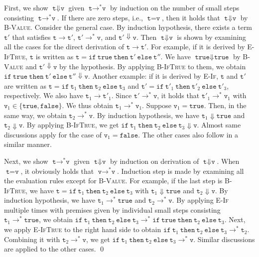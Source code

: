 \documentclass{article}
\newcommand{\code}[1]{\texttt{#1}}
\newcommand{\Bigstep}{\Downarrow}
\newcommand{\False}{\code{false}}
\newcommand{\IfThenElse}[3]{\code{if}~#1~\code{then}~#2~\code{else}~#3}
\newcommand{\Rule}[1]{\textsc{#1}}
\newcommand{\True}{\code{true}}
\begin{document}
First, we show $\code t \Bigstep \code v$ given $\code t \to^* \code v$
  by induction on the number of small steps consisting $\code t \to^* \code v$.
If there are zero steps, i.e., $\code t = \code v$,
  then it holds that $\code t \Bigstep \code v$ by \Rule{B-Value}.
Consider the general case.
By induction hypothesis,
  there exists a term $\code t'$ that satisfies
  $\code t \to \code t'$,
  $\code t' \to^* \code v$,
  and $\code t' \Bigstep \code v$.
Then $\code t \Bigstep \code v$ is shown by examining all the cases for
  the direct derivation of $\code t \to \code t'$.
For example, if it is derived by \Rule{E-IfTrue},
  $\code t$ is written as $\code t = \IfThenElse{\True}{\code t'}{\code t''}$.
We have $\True \Bigstep \True$ by \Rule{B-Value}
  and $\code t' \Bigstep \code v$ by the hypothesis.
By applying \Rule{B-IfTrue} to them,
  we obtain $\IfThenElse{\True}{\code t'}{\code t''} \Bigstep \code v$.
Another example: if it is derived by \Rule{E-If},
  $\code t$ and $\code t'$ are written as
  $\code t = \IfThenElse{\code t_1}{\code t_2}{\code t_3}$ and
  $\code t' = \IfThenElse{\code t'_1}{\code t'_2}{\code t'_3}$, respectively.
We also have $\code t_1 \to \code t'_1$.
Since $\code t' \to^* \code v$,
  it holds that $\code t'_1 \to^* \code v_1$ with $\code v_1 \in \{\True, \False\}$.
We thus obtain $\code t_1 \to^* \code v_1$.
Suppose $\code v_1 = \True$.
Then, in the same way, we obtain $\code t_2 \to^* \code v$.
By induction hypothesis,
  we have $\code t_1 \Bigstep \True$ and $\code t_2 \Bigstep \code v$.
By applying \Rule{B-IfTrue},
  we get $\IfThenElse{\code t_1}{\code t_2}{\code t_3} \Bigstep \code v$.
Almost same discussions apply for the case of $\code v_1 = \False$.
The other cases also follow in a similar manner.

Next, we show $\code t \to^* \code v$ given $\code t \Bigstep \code v$
  by induction on derivation of $\code t \Bigstep \code v$.
When $\code t = \code v$, it obviously holds that $\code v \to^* \code v$.
Induction step is made by examining all the evaluation rules except for \Rule{B-Value}.
For example, if the last step is \Rule{B-IfTrue},
  we have $\code t = \IfThenElse{\code t_1}{\code t_2}{\code t_3}$
  with $\code t_1 \Bigstep \True$ and $\code t_2 \Bigstep \code v$.
By induction hypothesis,
  we have $\code t_1 \to^* \True$ and $\code t_2 \to^* \code v$.
By applying \Rule{E-If} multiple times with premises given by
  individual small steps consisting $\code t_1 \to^* \True$,
  we obtain
  $
    \IfThenElse{\code t_1}{\code t_2}{\code t_3} \to^*
    \IfThenElse{\True}{\code t_2}{\code t_3}
  $.
Next, we apply \Rule{E-IfTrue} to the right hand side to obtain
  $\IfThenElse{\code t_1}{\code t_2}{\code t_3} \to^* \code t_2$.
Combining it with $\code t_2 \to^* \code v$,
  we get $\IfThenElse{\code t_1}{\code t_2}{\code t_3} \to^* \code v$.
Similar discussions are applied to the other cases. \qed
\end{document}

